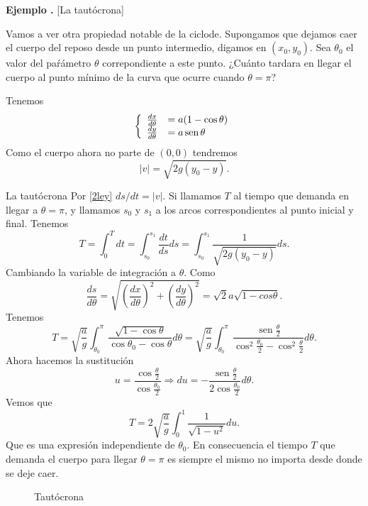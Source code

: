 \documentclass{article}
\DeclareMathOperator{\sen}{sen}
\newcounter{ejemplo_cont}
\newenvironment{ejemplo}{\noindent\textbf{Ejemplo  \arabic{ejemplo_cont}.} }{\addtocounter{ejemplo_cont}{1}}
\begin{document}
  \begin{ejemplo}[La tautócrona]


  \end{ejemplo}




  Vamos a ver otra propiedad notable de la ciclode. Supongamos que dejamos caer el cuerpo del reposo desde un punto intermedio, digamos en $(x_0,y_0)$. Sea  $\theta_0$
 el valor del paŕámetro $\theta$ correpondiente a este punto. ¿Cuánto tardara en llegar el cuerpo al punto mínimo de la curva que ocurre cuando $\theta=\pi$? 


  
  

 Tenemos
\[
 \left\{ \begin{array}{l l}
 \frac{dx}{d\theta}&=a(1-\cos\theta)\\
 \frac{dy}{d\theta}&=a\sen\theta 
 \end{array}\right.
\]
% 
Como el cuerpo ahora no parte de $(0,0)$ tendremos
\[|v|=\sqrt{2g(y_0-y)}.\]


  
  {La tautócrona}
Por \eqref{2ley} $ds/dt=|v|$. Si llamamos $T$ al tiempo que demanda en llegar a $\theta=\pi$, y llamamos  $s_0$ y $s_1$ a los arcos correspondientes al punto inicial
y final.  Tenemos
 \[T=\int_0^Tdt=\int_{s_0}^{s_1}\frac{dt}{ds}ds=\int_{s_0}^{s_1}\frac{1}{\sqrt{2g(y_0-y)}}ds.\]
Cambiando la variable de integración a $\theta$. Como 
\[
 \frac{ds}{d\theta}=\sqrt{\left(\frac{dx}{d\theta}\right)^2+\left(\frac{dy}{d\theta}\right)^2}=\sqrt{2}a\sqrt{1-cos\theta}.
\]
 Tenemos
\[T=\sqrt{\frac{a}{g}}\int_{\theta_0}^{\pi}\frac{\sqrt{1-\cos\theta}}{\cos\theta_0-\cos\theta}d\theta=
\sqrt{\frac{a}{g}}\int_{\theta_0}^{\pi}\frac{\sen\frac{\theta}{2}}{\cos^2\frac{\theta_0}{2}-\cos^2\frac{\theta}{2}}d\theta.
\]
Ahora hacemos la sustitución
\[u=\frac{\cos\frac{\theta}{2}}{\cos\frac{\theta_0}{2}}\Longrightarrow du=-\frac{\sen\frac{\theta}{2}}{2\cos\frac{\theta_0}{2}}d\theta.\]
Vemos que
\[
 T=2\sqrt{\frac{a}{g}}\int_0^1\frac{1}{\sqrt{1-u^2}}du.
\]
Que es una expresión independiente de $\theta_0$. En consecuencia el tiempo $T$ que demanda  el cuerpo para llegar $\theta=\pi$ es siempre el mismo no importa
desde donde se deje caer.

\begin{figure}[h]
\begin{center}
\end{center}\caption{Tautócrona}\label{fig:tautocrona}
\end{figure}
\end{document}
